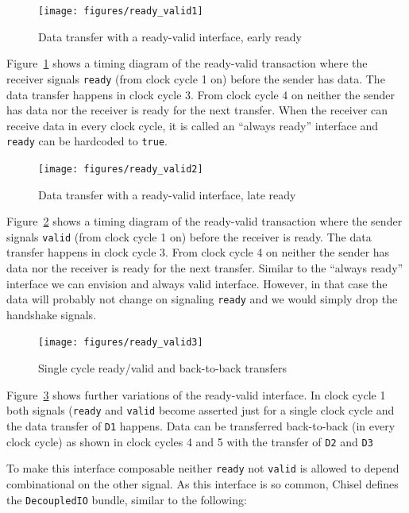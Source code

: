 \documentclass[%
    10pt,
    headinclude, footexclude,
    openright, %
    notitlepage,
    cleardoubleempty,
    headsepline,
    pointlessnumbers,
    bibtotoc, idxtotoc,
    ]{scrbook}
\newcommand{\code}[1]{{\small{\texttt{#1}}}}
\begin{document}
\begin{figure}
  \centering
  \texttt{[image: figures/ready\_valid1]}
  \caption{Data transfer with a ready-valid interface, early ready}
  \label{fig:ready_valid1}
\end{figure}

Figure~\ref{fig:ready_valid1} shows a timing diagram of the ready-valid
transaction where the receiver signals \code{ready} (from clock cycle 1 on)
before the sender has data. The data transfer happens in clock cycle 3.
From clock cycle 4 on neither the sender has data nor the receiver is ready
for the next transfer.
When the receiver can receive data in every clock cycle, it is called an
``always ready'' interface and \code{ready} can be hardcoded to \code{true}.

\begin{figure}
  \centering
  \texttt{[image: figures/ready\_valid2]}
  \caption{Data transfer with a ready-valid interface, late ready}
  \label{fig:ready_valid2}
\end{figure}

Figure~\ref{fig:ready_valid2} shows a timing diagram of the ready-valid
transaction where the sender signals \code{valid} (from clock cycle 1 on)
before the receiver is ready. The data transfer happens in clock cycle 3.
From clock cycle 4 on neither the sender has data nor the receiver is ready
for the next transfer.
Similar to the ``always ready'' interface we can envision and always valid
interface. However, in that case the data will probably not change on signaling
\code{ready} and we would simply drop the handshake signals.

\begin{figure}
  \centering
  \texttt{[image: figures/ready\_valid3]}
  \caption{Single cycle ready/valid and back-to-back transfers}
  \label{fig:ready_valid3}
\end{figure}

Figure~\ref{fig:ready_valid3} shows further variations of the ready-valid
interface. In clock cycle 1 both signals (\code{ready} and \code{valid}
become asserted just for a single clock cycle and the data transfer
of \code{D1} happens. Data can be transferred back-to-back (in every
clock cycle) as shown in clock cycles 4 and 5 with the transfer of
\code{D2} and \code{D3}

To make this interface composable neither \code{ready} not \code{valid} is
allowed to depend combinational on the other signal.
As this interface is so common, Chisel defines the \code{DecoupledIO}
bundle, similar to the following:
\end{document}
